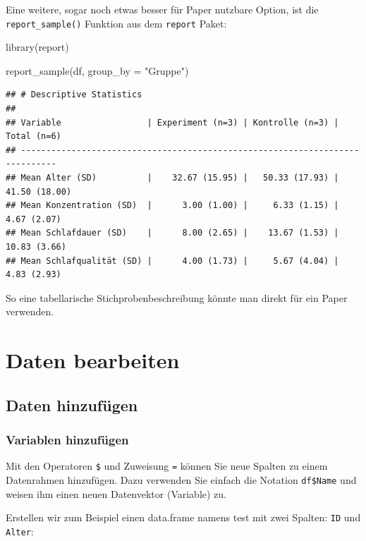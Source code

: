 \documentclass[
]{book}
\newenvironment{Shaded}{\begin{snugshade}}{\end{snugshade}}
\newcommand{\AttributeTok}[1]{\textcolor[rgb]{0.77,0.63,0.00}{#1}}
\newcommand{\FunctionTok}[1]{\textcolor[rgb]{0.00,0.00,0.00}{#1}}
\newcommand{\NormalTok}[1]{#1}
\newcommand{\StringTok}[1]{\textcolor[rgb]{0.31,0.60,0.02}{#1}}
\begin{document}
Eine weitere, sogar noch etwas besser für Paper nutzbare Option, ist die \texttt{report\_sample()} Funktion aus dem \texttt{report} Paket:

\begin{Shaded}
\begin{Highlighting}[]
\FunctionTok{library}\NormalTok{(report)}

\FunctionTok{report\_sample}\NormalTok{(df, }\AttributeTok{group\_by =} \StringTok{"Gruppe"}\NormalTok{)}
\end{Highlighting}
\end{Shaded}

\begin{verbatim}
## # Descriptive Statistics
## 
## Variable                 | Experiment (n=3) | Kontrolle (n=3) |   Total (n=6)
## -----------------------------------------------------------------------------
## Mean Alter (SD)          |    32.67 (15.95) |   50.33 (17.93) | 41.50 (18.00)
## Mean Konzentration (SD)  |      3.00 (1.00) |     6.33 (1.15) |   4.67 (2.07)
## Mean Schlafdauer (SD)    |      8.00 (2.65) |    13.67 (1.53) |  10.83 (3.66)
## Mean Schlafqualität (SD) |      4.00 (1.73) |     5.67 (4.04) |   4.83 (2.93)
\end{verbatim}

So eine tabellarische Stichprobenbeschreibung könnte man direkt für ein Paper verwenden.

\hypertarget{daten-bearbeiten}{%
\chapter{Daten bearbeiten}\label{daten-bearbeiten}}

\hypertarget{daten-hinzufuxfcgen}{%
\section{Daten hinzufügen}\label{daten-hinzufuxfcgen}}

\hypertarget{variablen-hinzufuxfcgen}{%
\subsection{Variablen hinzufügen}\label{variablen-hinzufuxfcgen}}

Mit den Operatoren \texttt{\$} und Zuweisung \texttt{=} können Sie neue Spalten zu einem Datenrahmen hinzufügen. Dazu verwenden Sie einfach die Notation \texttt{df\$Name} und weisen ihm einen neuen Datenvektor (Variable) zu.

Erstellen wir zum Beispiel einen data.frame namens test mit zwei Spalten: \texttt{ID} und \texttt{Alter}:
\end{document}
